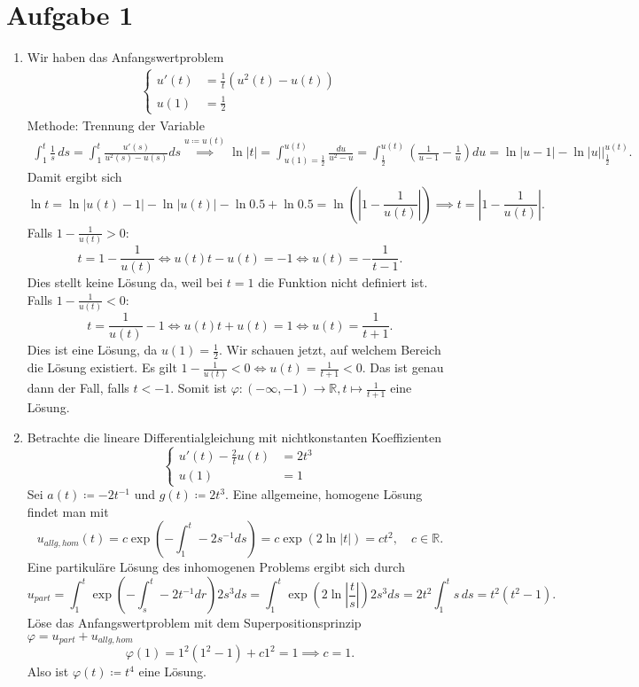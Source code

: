 \documentclass[9pt]{extarticle}
\theoremstyle{named}
\begin{document}
	
\section*{Aufgabe 1}
\begin{enumerate}[label=(\roman*)]
	\item Wir haben das Anfangswertproblem
	\begin{align*}
		\begin{cases} 
			u'(t) &= \frac{1}{t}(u^2(t)-u(t)) \\
			u(1)&= \frac{1}{2}
		\end{cases}
	\end{align*}
	Methode: Trennung der Variable
	\begin{align*}
		\int^t_1 \frac{1}{s} \, ds = \int^t_1 \frac{u'(s)}{u^2(s)-u(s)}ds \overset{u\coloneqq u(t)}{\implies}
		\ln|t| = \int^{u(t)}_{u(1) = \frac{1}{2}} \frac{du}{u^2-u} =  \int^{u(t)}_{\frac{1}{2}} \left(\frac{1}{u-1}-\frac{1}{u}\right)du = \ln|u-1| - \ln|u| \bigg \rvert^{u(t)}_{\frac{1}{2}}.
	\end{align*}
	Damit ergibt sich
	\[
		\ln t = \ln|u(t)-1|-\ln|u(t)| - \ln0.5 + \ln0.5 = \ln(|1-\frac{1}{u(t)}|) \implies t = |1-\frac{1}{u(t)}|.
	\]
	Falls $1-\frac{1}{u(t)}>0$:
	\[
		t = 1-\frac{1}{u(t)} \iff u(t)t  - u(t) = -1 \iff u(t) = -\frac{1}{t-1}.
	\]
	Dies stellt keine Lösung da, weil bei $t = 1$ die Funktion nicht definiert ist. Falls $1-\frac{1}{u(t)}<0$:
	\[
		t = \frac{1}{u(t)} - 1 \iff u(t)t +u(t)= 1 \iff u(t) = \frac{1}{t+1}.
	\]
	Dies ist eine Lösung, da $u(1) = \frac{1}{2}$. Wir schauen jetzt, auf welchem Bereich die Lösung existiert. Es gilt $1-\frac{1}{u(t)}<0 \iff u(t) = \frac{1}{t+1}  < 0$. Das ist genau dann der Fall, falls $t<-1$. Somit ist $\varphi: (-\infty, -1) \to \mathbb R, t \mapsto \frac{1}{t+1}$ eine Lösung.
	
	\item Betrachte die lineare Differentialgleichung mit nichtkonstanten Koeffizienten
	\[
		\begin{cases} 
		u'(t) - \frac{2}{t}u(t) &= 2t^3 \\
		u(1)&= 1
		\end{cases}
	\]
	Sei $a(t) \coloneqq -2t^{-1}$ und $g(t) \coloneqq 2t^3$. Eine allgemeine, homogene Lösung findet man mit
	\[
		u_{allg,hom}(t) = c\exp(-\int^t_1 -2s^{-1}ds) = c \exp(2\ln|t|) = ct^2, \quad c \in \mathbb R.
	\]
	Eine partikuläre Lösung des inhomogenen Problems ergibt sich durch
	\[
		u_{part} = \int^t_1 \exp(-\int^t_s -2t^{-1} dr) 2s^3 ds = \int^t_1 \exp(2\ln|\frac{t}{s}|) 2s^3ds = 2t^2\int^t_1 s \, ds = t^2(t^2-1).
	\]
	Löse das Anfangswertproblem mit dem Superpositionsprinzip $\varphi = u_{part} + u_{allg,hom}$
	\[
		\varphi(1) = 1^2(1^2-1) + c1^2 = 1 \implies c=1.
	\]
	Also ist $\varphi(t) \coloneqq t^4$ eine Lösung.
\end{enumerate}	
\end{document}
